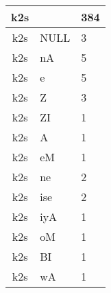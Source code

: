 \documentclass[a4 paper]{article}
\begin{document}
\begin{longtable}{cp{}p{}}
k2s &  & 384\\ \midrule k2s & NULL & 3\\ \midrule k2s & nA & 5\\ \midrule k2s & e & 5\\ \midrule k2s & Z & 3\\ \midrule k2s & ZI & 1\\ \midrule k2s & A & 1\\ \midrule k2s & eM & 1\\ \midrule k2s & ne & 2\\ \midrule k2s & ise & 2\\ \midrule k2s & iyA & 1\\ \midrule k2s & oM & 1\\ \midrule k2s & BI & 1\\ \midrule k2s & wA & 1\\ \midrule 

\end{longtable}
\end{document}
